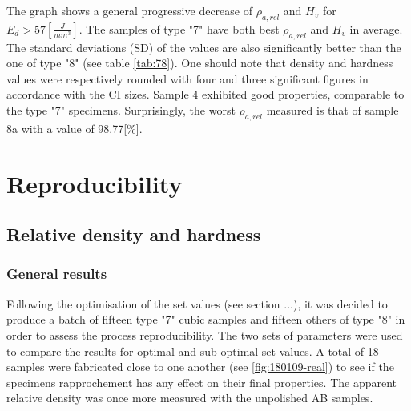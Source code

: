  The graph shows a general progressive decrease of  $\rho_{a,rel}$ and $H_v$ for $E_d>57 [\frac{J}{mm^3}]$. The samples of type "7" have both best $\rho_{a,rel}$ and $H_v$ in average. The standard deviations (SD) of the values are also significantly better than the one of type "8" (see table \ref{tab:78}). One should note that density and hardness values were respectively rounded with four and three significant figures in accordance with the CI sizes. Sample 4 exhibited good properties, comparable to the type "7" specimens. Surprisingly, the worst $\rho_{a,rel}$ measured is that of sample 8a with a value of 98.77[\%].  \\

 \begin{center}
\begin{table}[ht]
\noindent{}

\caption[Standard deviations and average values for apparent relative densities and hardnesses of types "7" and "8" specimens of batch X200-171024]{Standard deviations and average values for apparent relative densities and hardnesses of types "7" and "8" specimens of batch X200-171024}
\label{tab:78}
\end{table}
 \end{center}

\section{Reproducibility}
\label{RReprod}
\subsection{Relative density and hardness}
\subsubsection{General results}
Following the optimisation of the set values (see section ...), it was decided to produce a batch of fifteen type "7" cubic samples and fifteen others of type "8" in order to assess the process reproducibility. The two sets of parameters were used to compare the results for optimal and sub-optimal set values. A total of 18 samples were fabricated close to one another (see \ref{fig:180109-real}) to see if the specimens rapprochement has any effect on their final properties. The apparent relative density was once more measured with the unpolished AB samples.\\

